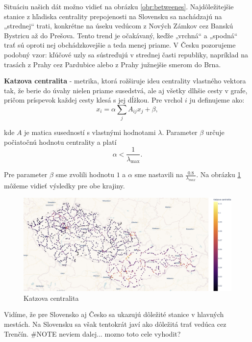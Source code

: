 \documentclass[main.tex]{subfiles}
\begin{document}
Situáciu našich dát možno vidieť na obrázku \ref{obr:betweenes}. Najdôležitejšie stanice z hľadiska centrality prepojenosti na Slovensku sa nachádzajú na „strednej“ trati, konkrétne na úseku vedúcom z Nových Zámkov cez Banskú Bystricu až do Prešova. Tento trend je očakávaný, keďže „vrchná“ a „spodná“ trať sú oproti nej obchádzkovejšie a teda menej priame. V Česku pozorujeme podobný vzor: kľúčové uzly sa sústreďujú v strednej časti republiky, napríklad na trasách z Prahy cez Pardubice alebo z Prahy južnejšie smerom do Brna.

\textbf{Katzova centralita} - metrika, ktorá rožširuje ideu centrality vlastného vektora tak, že berie do úvahy nielen priame susedstvá,  ale aj všetky dlhšie cesty v grafe, pričom príspevok každej cesty klesá s jej dĺžkou. Pre vrchol $i$ ju definujeme ako:
\begin{equation*}
    x_i = \alpha \sum_{j} A_{ij} x_j + \beta,
\end{equation*}

kde $A$ je matica susedností s vlastnými hodnotami $\lambda$.
Parameter $\beta$ určuje počiatočnú hodnotu centrality a platí
\begin{equation*}
    \alpha < \frac{1}{\lambda_{\max}}.    
\end{equation*}

Pre parameter $\beta$ sme zvolili hodnotu $1$ a $\alpha$ sme nastavili na $\frac{0.8}{\lambda_{max}}$. Na obrázku \ref{obr:katz} môžeme vidieť výsledky pre obe krajiny.

\begin{figure}
    \centerline{\includegraphics[width=1.2\textwidth]{images/katz.png}}
    \caption{Katzova centralita}
    \label{obr:katz}
\end{figure}

Vidíme, že pre Slovensko aj Česko sa ukazujú dôležité stanice v hlavných mestách. Na Slovensku sa však tentokrát javí ako dôležitá  trať vedúca cez Trenčín. \#NOTE neviem dalej... mozno toto cele vyhodit?
\end{document}
